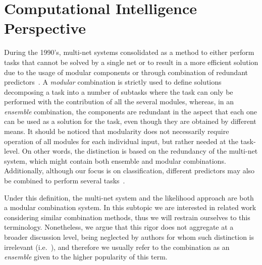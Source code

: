 \section{Computational Intelligence Perspective}%
\label{sec:ml_ensemble}

During the 1990's, multi-net systems consolidated as a method to either perform
tasks that cannot be solved by a single net or to result in a more efficient
solution due to the usage of modular components or through combination of
redundant predictors~\cite{SharkeyCombNN}. A \emph{modular} combination is
strictly used to define solutions decomposing a task into a number of subtasks
where the task can only be performed with the contribution of all the several
modules, whereas, in an \emph{ensemble} combination, the components are
redundant in the aspect that each one can be used as a solution for the task,
even though they are obtained by different means. It should be noticed that
modularity does not necessarily require operation of all modules for each
individual input, but rather needed at the task-level. On other words, the
distinction is based on the redundancy of the multi-net system, which might
contain both ensemble and modular combinations. Additionally, although our focus
is on classification, different predictors may also be combined to perform
several tasks~\cite{zhou_ensemble}.

Under this definition, the \rnn multi-net system and the likelihood approach are
both a modular combination system. In this subtopic we are interested in related
work considering similar combination methods, thus we will restrain ourselves
to this terminology. Nonetheless, we argue that this rigor does not aggregate at
a broader discussion level, being neglected by authors for whom such distinction
is irrelevant (i.e.~\cite{zhou_ensemble}), and therefore we usually refer to the
combination as an \emph{ensemble} given to the higher popularity of this term.

